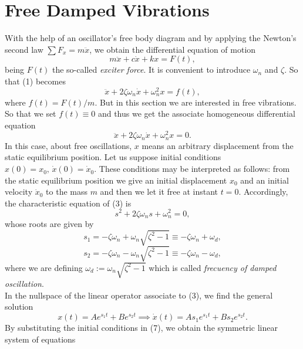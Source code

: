 \documentclass[12pt]{article}
\begin{document}
\section{Free Damped Vibrations}
With the help of an oscillator's free body diagram and by applying the Newton's second law $\sum F_x=m\ddot{x}$, we obtain the differential equation of motion
\begin{equation}
m\ddot{x}+c\dot{x}+kx=F(t),
\end{equation}
being $F(t)$ the so-called \emph{exciter force}. It is convenient to introduce $\omega_n$ and $\zeta$. So that (1) becomes
\begin{equation}
\ddot{x}+2\zeta\omega_n\dot{x}+\omega_n^2 x=f(t),
\end{equation}
where $f(t)=F(t)/m$. But in this section we are interested in free vibrations. So that we set $f(t)\equiv 0$ and thus we get the associate homogeneous differential equation
\begin{equation}
\ddot{x}+2\zeta\omega_n\dot{x}+\omega_n^2 x=0.
\end{equation}
In this case, about free oscillations, $x$ means an arbitrary displacement from the static equilibrium position. Let us suppose initial conditions $x(0)=x_0, \, \dot{x}(0)=\dot{x}_0$. These conditions may be interpreted as follows: from the static equilibrium position we give an initial displacement $x_0$ and an initial velocity $\dot{x}_0$ to the mass $m$ and then we let it free at instant $t=0$. Accordingly, the characteristic equation of (3) is
\begin{equation}
s^2+2\zeta\omega_n s+ \omega_n^2=0,
\end{equation}
whose roots are given by
\begin{equation}
s_1 = -\zeta\omega_n + \omega_n\sqrt{\zeta^2-1} \equiv -\zeta\omega_n+\omega_d, 
\end{equation}
\begin{equation}
s_2 = -\zeta\omega_n - \omega_n\sqrt{\zeta^2-1} \equiv -\zeta\omega_n-\omega_d, 
\end{equation}
where we are defining $\omega_d := \omega_n\sqrt{\zeta^2-1}$ which is called \emph{frecuency of damped oscillation}. \\
In the nullspace of the linear operator associate to (3), we find the general solution
\begin{equation}
x(t)=Ae^{s_1t}+Be^{s_2t}\implies\dot{x}(t)=As_1e^{s_1t}+Bs_2e^{s_2t}.
\end{equation}
By substituting the initial conditions in (7), we obtain the symmetric linear system of equations
\end{document}
